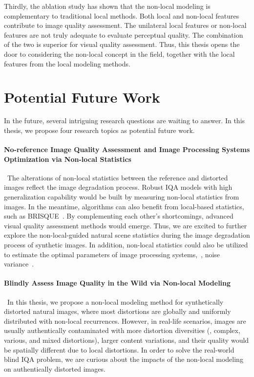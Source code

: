 Thirdly, the ablation study has shown that the non-local modeling is complementary to traditional local methods. Both local and non-local features contribute to image quality assessment. The unilateral local features or non-local features are not truly adequate to evaluate perceptual quality. The combination of the two is superior for visual quality assessment. Thus, this thesis opens the door to considering the non-local concept in the field, together with the local features from the local modeling methods.

\section{Potential Future Work}
In the future, several intriguing research questions are waiting to answer. In this thesis, we propose four research topics as potential future work.

\paragraph{No-reference Image Quality Assessment and Image Processing Systems Optimization via Non-local Statistics}~The alterations of non-local statistics between the reference and distorted images reflect the image degradation process. Robust IQA models with high generalization capability would be built by measuring non-local statistics from images. In the meantime, algorithms can also benefit from local-based statistics, such as BRISQUE~\citep{mittal2012no}. By complementing each other's shortcomings, advanced visual quality assessment methods would emerge. Thus, we are excited to further explore the non-local-guided natural scene statistics during the image degradation process of synthetic images. In addition, non-local statistics could also be utilized to estimate the optimal parameters of image processing systems,~\eg, noise variance~\citep{mittal2012no, zhu2010automatic}.

\paragraph{Blindly Assess Image Quality in the Wild via Non-local Modeling}~In this thesis, we propose a non-local modeling method for synthetically distorted natural images, where most distortions are globally and uniformly distributed with non-local recurrences. However, in real-life scenarios, images are usually authentically contaminated with more distortion diversities (\ie, complex, various, and mixed distortions), larger content variations, and their quality would be spatially different due to local distortions. In order to solve the real-world blind IQA problem, we are curious about the impacts of the non-local modeling on authentically distorted images.

